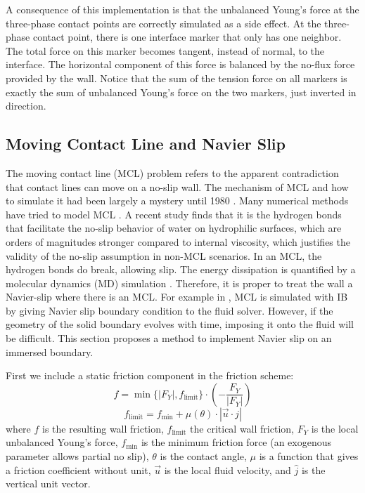\documentclass{jfm}
\newcommand{\daniel}[1]{\todo[inline,color=yellow!40]{Daniel: #1}}
\begin{document}
A consequence of this implementation is that the unbalanced Young’s force at the three-phase contact points are correctly simulated as a side effect. At the three-phase contact point, there is one interface marker that only has one neighbor. The total force on this marker becomes tangent, instead of normal, to the interface. The horizontal component of this force is balanced by the no-flux force provided by the wall. Notice that the sum of the tension force on all markers is exactly the sum of unbalanced Young’s force on the two markers, just inverted in direction. 
\daniel{image}

\subsection{Moving Contact Line and Navier Slip}
The moving contact line (MCL) problem refers to the apparent contradiction that contact lines can move on a no-slip wall. The mechanism of MCL and how to simulate it had been largely a mystery until 1980 \cite{1979_MCL_confusion}. Many numerical methods have tried to model MCL \cite{2014_MCL_review, curved_solid_DI_IB}. A recent study \cite{its_the_bonds_original} finds that it is the hydrogen bonds that facilitate the no-slip behavior of water on hydrophilic surfaces, which are orders of magnitudes stronger compared to internal viscosity, which justifies the validity of the no-slip assumption in non-MCL scenarios. In an MCL, the hydrogen bonds do break, allowing slip. The energy dissipation is quantified by a molecular dynamics (MD) simulation \cite{MD_2018_its_the_bonds}. Therefore, it is proper to treat the wall a Navier-slip where there is an MCL. For example in \cite{MCL_IBM_surfactant}, MCL is simulated with IB by giving Navier slip boundary condition to the fluid solver. However, if the geometry of the solid boundary evolves with time, imposing it onto the fluid will be difficult. This section proposes a method to implement Navier slip on an immersed boundary. 

First we include a static friction component in the friction scheme: 
\begin{equation}
    f=\min\{|F_Y|,f_\text{limit}\}
    \cdot
    \left(
    -\frac{F_Y}{|F_Y|}
    \right)
\end{equation}
\begin{equation}
    f_\text{limit}=
    f_{\text{min}}+\mu(\theta)
    \cdot
    |\vec{u}\cdot\hat{j}|
\end{equation}
where $f$ is the resulting wall friction, $f_\text{limit}$ the critical wall friction, $F_Y$ is the local unbalanced Young's force, $f_{\text{min}}$ is the minimum friction force (an exogenous parameter allows partial no slip), $\theta$ is the contact angle, $\mu$ is a function that gives a friction coefficient without unit, $\vec{u}$ is the local fluid velocity, and $\hat{j}$ is the vertical unit vector.
\end{document}
